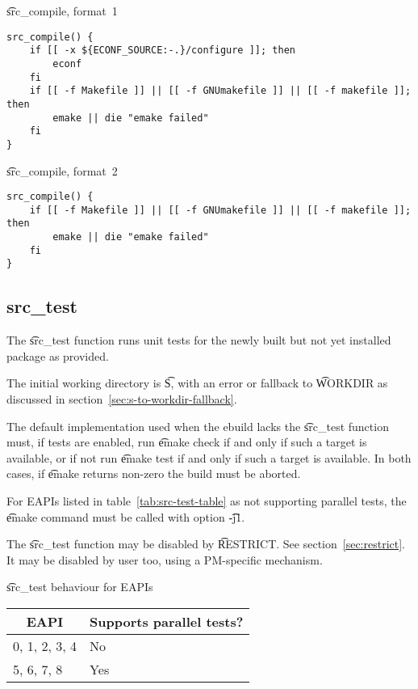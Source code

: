 \begin{listing}[H]
\caption{\t{src_compile}, format~1} \label{lst:src-compile-1}
\begin{verbatim}
src_compile() {
    if [[ -x ${ECONF_SOURCE:-.}/configure ]]; then
        econf
    fi
    if [[ -f Makefile ]] || [[ -f GNUmakefile ]] || [[ -f makefile ]]; then
        emake || die "emake failed"
    fi
}
\end{verbatim}
\end{listing}

\begin{listing}[H]
\caption{\t{src_compile}, format~2} \label{lst:src-compile-2}
\begin{verbatim}
src_compile() {
    if [[ -f Makefile ]] || [[ -f GNUmakefile ]] || [[ -f makefile ]]; then
        emake || die "emake failed"
    fi
}
\end{verbatim}
\end{listing}

\subsection{src_test}

The \t{src_test} function runs unit tests for the newly built but not yet installed package as
provided.

The initial working directory is \t{S}, with an error or fallback to \t{WORKDIR} as discussed in
section~\ref{sec:s-to-workdir-fallback}.

The default implementation used when the ebuild lacks the \t{src_test} function must, if tests are
enabled, run \t{emake check} if and only if such a target is available, or if not run
\t{emake test} if and only if such a target is available. In both cases, if \t{emake} returns
non-zero the build must be aborted.

 For EAPIs listed in table~\ref{tab:src-test-table} as not supporting
parallel tests, the \t{emake} command must be called with option \t{-j1}.

The \t{src_test} function may be disabled by \t{RESTRICT}\@. See section~\ref{sec:restrict}. It may
be disabled by user too, using a PM-specific mechanism.

\begin{centertable}{\t{src_test} behaviour for EAPIs}
    \label{tab:src-test-table}
    \begin{tabular}{ll}
      \toprule
      \multicolumn{1}{c}{\textbf{EAPI}} &
      \multicolumn{1}{c}{\textbf{Supports parallel tests?}} \\
      \midrule
      0, 1, 2, 3, 4     & No  \\
      5, 6, 7, 8        & Yes \\
      \bottomrule
    \end{tabular}
\end{centertable}

